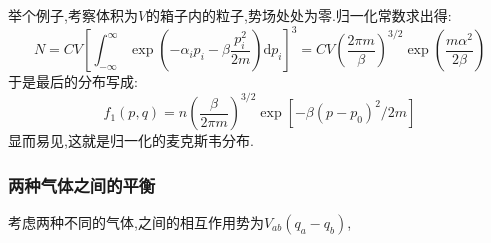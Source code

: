     举个例子,考察体积为$V$的箱子内的粒子,势场处处为零.归一化常数求出得:
    \[N=CV\left[ \int_{-\infty}^{\infty} \exp(-\alpha_{i}p_{i}-\beta\frac{p_{i}^{2}}{2m}) \mathrm{d}p_{i} \right] ^{3}=CV\left( \frac{2\pi m}{\beta} \right) ^{3 /2} \exp(\frac{m\alpha^{2}}{2\beta})\]
    于是最后的分布写成:
    \[f_1(p,q)=n\left( \frac{\beta}{2\pi m} \right) ^{3 /2}\exp\left[ -\beta(p-p_0)^{2}/2m \right] \]
    显而易见,这就是归一化的麦克斯韦分布.

\subsubsection*{两种气体之间的平衡}
    考虑两种不同的气体,之间的相互作用势为$V_{ab}(q_{a}-q_{b})$,